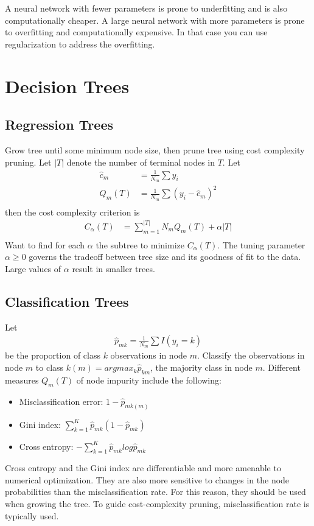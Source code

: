 \documentclass[12pt]{article}
\begin{document}
A neural network with fewer parameters is prone to underfitting and is also computationally cheaper. A large neural network with more parameters is prone to overfitting and computationally expensive. In that case you can use regularization to address the overfitting. 

\section{Decision Trees}

\subsection{Regression Trees}
Grow tree until some minimum node size, then prune tree using cost complexity pruning. Let $|T|$ denote the number of terminal nodes in $T$.
Let
\begin{align*}
    \hat{c}_m &= \frac{1}{N_m}\sum y_i \\
    Q_m(T) &= \frac{1}{N_m}\sum(y_i - \hat{c}_m)^2 \\
\end{align*}
then the cost complexity criterion is
\begin{align*}
    C_{\alpha}(T) &= \sum_{m=1}^{|T|}N_mQ_m(T)+\alpha |T| \\
\end{align*}
Want to find for each $\alpha$ the subtree to minimize $C_{\alpha}(T)$. The tuning parameter $\alpha \ge 0$ governs the tradeoff between tree size and its goodness of fit to the data. Large values of $\alpha$ result in smaller trees.

\subsection{Classification Trees}
Let
\begin{align*}
    \hat{p}_{mk} = \frac{1}{N_m}\sum I(y_i=k)
\end{align*}
be the proportion of class $k$ observations in node $m$. Classify the observations in node $m$ to class $k(m)=argmax_k\hat{p}_{km}$, the majority class in node $m$. Different measures $Q_m(T)$ of node impurity include the following:
\begin{itemize}
    \item Misclassification error: $1 - \hat{p}_{mk(m)}$
    \item Gini index: $\sum_{k=1}^{K}\hat{p}_{mk}(1-\hat{p}_{mk})$
    \item Cross entropy: $-\sum_{k=1}^{K}\hat{p}_{mk}log\hat{p}_{mk}$
\end{itemize}
Cross entropy and the Gini index are differentiable and more amenable to numerical optimization. They are also more sensitive to changes in the node probabilities than the misclassification rate. For this reason, they should be used when growing the tree. To guide cost-complexity pruning, misclassification rate is typically used.
\end{document}
